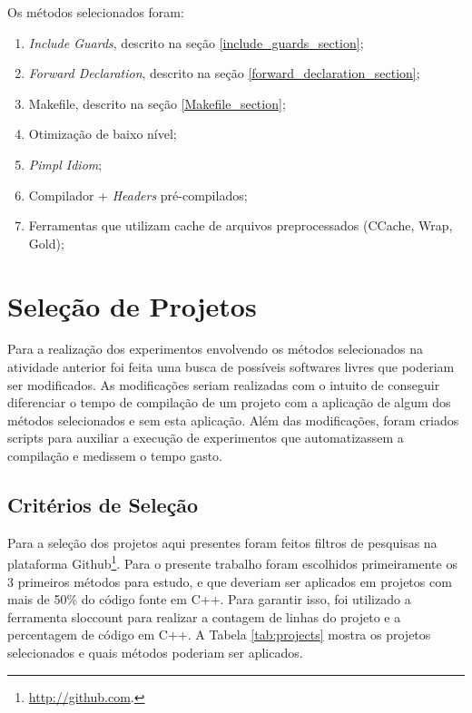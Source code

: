 Os métodos selecionados foram:

\begin{enumerate}
	\item \textit{Include Guards}, descrito na seção
 \ref{include_guards_section};
	\item \textit{Forward Declaration}, descrito na seção
 \ref{forward_declaration_section};
	\item Makefile, descrito na seção
 \ref{Makefile_section};
	\item Otimização de baixo nível;
	\item \textit{Pimpl Idiom};
	\item Compilador + \textit{Headers} pré-compilados;
	\item Ferramentas que utilizam cache de arquivos 
preprocessados (CCache, Wrap, Gold);
\end{enumerate}

\section{Seleção de Projetos}

Para a realização dos experimentos  envolvendo os métodos selecionados na
 atividade anterior foi feita uma busca de possíveis softwares livres que
 poderiam ser modificados.  As modificações seriam realizadas com o intuito
 de conseguir diferenciar o tempo de compilação de um projeto com a aplicação
 de algum dos métodos selecionados e sem  esta aplicação. Além das
 modificações, foram criados scripts para auxiliar a execução de experimentos
 que automatizassem a compilação e medissem o tempo gasto.

\subsection{Critérios de Seleção}


Para a seleção dos projetos aqui presentes foram feitos filtros de pesquisas
 na plataforma Github\footnote{\url{http://github.com}.}. Para o presente
 trabalho foram escolhidos primeiramente os 3 primeiros métodos para estudo,
 e que deveriam ser aplicados em projetos com mais de 50\% do código fonte em
 C++. Para garantir isso, foi utilizado a ferramenta sloccount para realizar
 a contagem de linhas do projeto e a percentagem de código em C++.
 A Tabela \ref{tab:projects} mostra os projetos selecionados e quais métodos
 poderiam ser aplicados.

